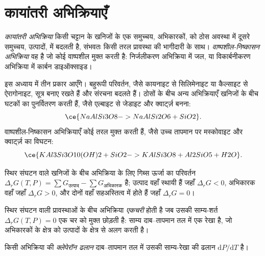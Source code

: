 \section{कायांतरी अभिक्रियाएँ}\label{sec:b2:metamorphic-facies:reactions}

\begin{definition}[कायांतरी अभिक्रिया; वाष्पशील-निष्कासन अभिक्रिया]\label{def:b2:metamorphic-facies:reaction}
\emph{कायांतरी अभिक्रिया} किसी चट्टान के खनिजों के एक समुच्चय,
अभिकारकों, को ठोस अवस्था में दूसरे समुच्चय, उत्पादों, में बदलती है, संभवतः
किसी तरल प्रावस्था की भागीदारी के साथ। \emph{वाष्पशील-निष्कासन अभिक्रिया}
वह है जो कोई वाष्पशील मुक्त करती है: निर्जलीकरण अभिक्रिया में जल, या विकार्बनीकरण अभिक्रिया में कार्बन
डाइऑक्साइड।
\end{definition}

इस अध्याय में तीन प्रकार आएँगे। बहुरूपी परिवर्तन, जैसे कायनाइट से
सिलिमेनाइट या कैल्साइट से ऐरागोनाइट, सूत्र बनाए रखते हैं और संरचना बदलते हैं।
ठोसों के बीच अन्य अभिक्रियाएँ खनिजों के बीच घटकों का पुनर्वितरण करती हैं, जैसे
एल्बाइट से जेडाइट और क्वार्ट्ज़ बनना:
\[
\ce{NaAlSi3O8 -> NaAlSi2O6 + SiO2}.
\]
वाष्पशील-निष्कासन अभिक्रियाएँ कोई तरल मुक्त करती हैं, जैसे उच्च तापमान पर मस्कोवाइट और क्वार्ट्ज़ का
विघटन:
\[
\ce{KAl3Si3O10(OH)2 + SiO2 -> KAlSi3O8 + Al2SiO5 + H2O}.
\]

स्थिर संघटन वाले खनिजों के बीच अभिक्रिया के लिए गिब्स ऊर्जा का परिवर्तन
$\Delta_r G(T, P) = \sum G_{\text{उत्पाद}} - \sum G_{\text{अभिकारक}}$ है; उत्पाद
वहाँ स्थायी हैं जहाँ $\Delta_r G < 0$, अभिकारक वहाँ जहाँ $\Delta_r G > 0$, और दोनों
वहाँ सहअस्तित्व में होते हैं जहाँ $\Delta_r G = 0$।

\begin{definition}[एकचरी अभिक्रिया]\label{def:b2:metamorphic-facies:univariant}
स्थिर संघटन वाली प्रावस्थाओं के बीच अभिक्रिया \emph{एकचरी}
होती है जब उसकी साम्य-शर्त $\Delta_r G(T, P) = 0$ एक चर को
मुक्त छोड़ती है: साम्य दाब--तापमान तल में एक रेखा है, जो
अभिकारकों के क्षेत्र को उत्पादों के क्षेत्र से अलग करती है।
\end{definition}

\begin{definition}[क्लेपेरॉन ढलान]\label{def:b2:metamorphic-facies:clapeyron}
किसी अभिक्रिया की \emph{क्लेपेरॉन ढलान} दाब--तापमान तल में
उसकी साम्य-रेखा की ढलान $\mathrm dP/\mathrm dT$ है।
\end{definition}

